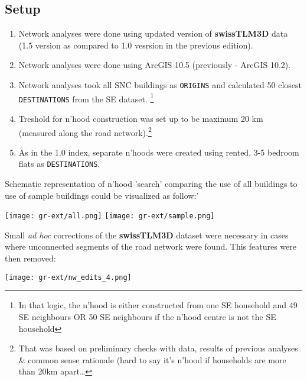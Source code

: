 \documentclass[a4paper, notitlepage, fleqn]{article} %
\begin{document}
\subsection{Setup}

\begin{enumerate}

	\item Network analyses were done using updated version of \textbf{swissTLM3D} data 
		(1.5 version as compared to 1.0 vesrsion in the previous edition).
	
	\item Network analyses were done using ArcGIS 10.5 (previously - ArcGIS 10.2).
	
	\item Network analyses took all SNC buildings as \texttt{ORIGINS} and calculated 
		50 closest \texttt{DESTINATIONS} from the SE dataset.
		\footnote{In that logic, the n'hood is either constructed from one SE household and 49 SE neighbours 
		OR 50 SE neighbours if the n'hood centre is not the SE household}		
	
	\item Treshold for n'hood construction was set up to be maximum 20 km (measured along the road network).\footnote{That was based 
		on preliminary checks with data, results of previous analyses \& common sense rationale (hard to say it's n'hood if households are more than 20km apart\ldots}
	
	\item As in the 1.0 index, separate n'hoods were created using rented, 3-5 bedroom flats as \texttt{DESTINATIONS}. 

\end{enumerate}

Schematic representation of n'hood 'search' comparing the use of all buildings to use of sample buildings could be visualized as follow:'

\begin{center}
\texttt{[image: gr-ext/all.png]}
\texttt{[image: gr-ext/sample.png]} 
\end{center}

Small \textit{ad hoc} corrections of the \textbf{swissTLM3D} dataset were necessary in cases where unconnected segments of the road network were found. This features were then removed: 

\begin{center}
\texttt{[image: gr-ext/nw\_edits\_4.png]}
\end{center}
\end{document}
